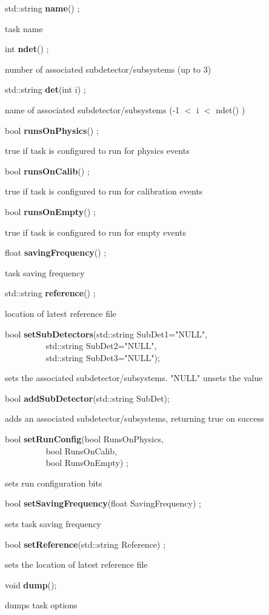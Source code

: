 \item    std::string {\bf name}() ;

 task name


\item    int {\bf ndet}() ;

 number of associated subdetector/subsystems (up to 3)


\item    std::string {\bf det}(int i) ;

 name of associated subdetector/subsystems (-1 $<$ i $<$ ndet() )


\item    bool {\bf runsOnPhysics}() ;

 true if task is configured to run for physics events


\item    bool {\bf runsOnCalib}() ;

 true if task is configured to run for calibration events


\item    bool {\bf runsOnEmpty}() ;

 true if task is configured to run for empty events


\item    float {\bf savingFrequency}() ;

 task saving frequency


\item    std::string {\bf reference}() ;

 location of latest reference file


\item    bool {\bf setSubDetectors}(std::string SubDet1="NULL",\\\mbox{}~~~~~~~~~ 
			std::string SubDet2="NULL",\\\mbox{}~~~~~~~~~ 
			std::string SubDet3="NULL");

 sets the associated subdetector/subsystems. "NULL" unsets the value 


\item    bool {\bf addSubDetector}(std::string SubDet);


 adds an associated subdetector/subsystems, returning true on success


\item    bool {\bf setRunConfig}(bool RunsOnPhysics,\\\mbox{}~~~~~~~~~ 
		    bool RunsOnCalib,\\\mbox{}~~~~~~~~~ 
		    bool RunsOnEmpty) ;

 sets run configuration bits


\item    bool {\bf setSavingFrequency}(float SavingFrequency) ;

 sets task saving frequency


\item    bool {\bf setReference}(std::string Reference) ;

 sets the location of latest reference file


\item    void {\bf dump}();


 dumps task options


